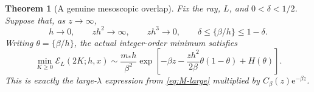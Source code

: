 \documentclass[11pt,a4paper]{article}
\numberwithin{equation}{section}
\newtheorem{theorem}{Theorem}[section]
\theoremstyle{definition}\newtheorem{definition}[theorem]{Definition}
\theoremstyle{remark}\newtheorem{remark}[theorem]{Remark}
\newcommand{\e}{\mathrm e}
\newcommand{\mstar}{m_*}
\newcommand{\calE}{\mathcal E}
\begin{document}
\begin{theorem}[A genuine mesoscopic overlap]
\label{thm:overlap}
Fix the ray, $L$, and $0<\delta<1/2$. Suppose that, as $z\to\infty$,
\begin{equation}
 h\to0,\qquad zh^2\to\infty,\qquad zh^3\to0,
 \qquad \delta\le\{\beta/h\}\le1-\delta.
 \label{eq:overlap-assumptions}
\end{equation}
Writing $\theta=\{\beta/h\}$, the actual integer-order minimum satisfies
\begin{equation}
 \min_{K\ge0}\calE_L(2K;h,x)
 \sim\frac{\mstar h}{\beta^2}
 \exp\left[-\beta z-\frac{zh^2}{2\beta}\theta(1-\theta)
                          +H(\theta)\right].
 \label{eq:overlap}
\end{equation}
This is exactly the large-$\lambda$ expression from
\eqref{eq:M-large} multiplied by $C_\beta(z)\e^{-\beta z}$.
\end{theorem}
\end{document}
